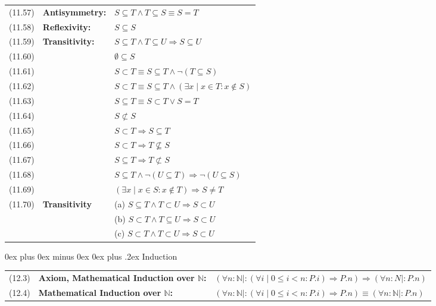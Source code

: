 \documentclass[letterpaper, 8pt]{extarticle}
\makeatletter
\renewcommand{\subsection}{\@startsection{subsection}{2}{0mm}%
                                {0ex plus 0ex minus 0ex}%
                                {0ex plus .2ex}%
                                {\normalfont\small\bfseries}}
\newcommand{\To}{\Rightarrow}
\makeatother
\begin{document}
\begin{multicols*}{3}
\begin{tabulary}{\linewidth}{@{}lLL@{}}
        (11.57) & \textbf{Antisymmetry:} & $S \subseteq T \land T \subseteq S \equiv S = T$ \\
        (11.58) & \textbf{Reflexivity:} & $S \subseteq S$ \\
        (11.59) & \textbf{Transitivity:} & $S \subseteq T \land T \subseteq U \To S \subseteq U$ \\
        (11.60) & & $\emptyset \subseteq S$ \\
        (11.61) & & $S \subset T \equiv S \subseteq T \land \neg (T \subseteq S)$ \\
        (11.62) & & $S \subset T \equiv S \subseteq T \land (\exists x \mid x \in T : x \notin S)$ \\
        (11.63) & & $S \subseteq T \equiv S \subset T \lor S = T$ \\
        (11.64) & & $S \not\subset S$ \\
        (11.65) & & $S \subset T \To S \subseteq T$ \\
        (11.66) & & $S \subset T \To T \not\subseteq S$ \\
        (11.67) & & $S \subseteq T \To T \not\subset S$ \\
        (11.68) & & $S \subseteq T \land \neg (U \subseteq T) \To \neg(U \subseteq S)$ \\
        (11.69) & & $(\exists x \mid x \in S : x \notin T) \To S \neq T$ \\
        (11.70) & \textbf{Transitivity} & (a) $S \subseteq T \land T \subset U \To S \subset U$ \\
        & & (b) $S \subset T \land T \subseteq U \To S \subset U$ \\
        & & (c) $S \subset T \land T \subset U \To S \subset U$ \\
    \end{tabulary}

    \subsection{Induction}
    \begin{tabulary}{\linewidth}{@{}lLL@{}}
        (12.3) & \textbf{Axiom, Mathematical Induction over $\mathbb{N}$:} & $(\forall n : \mathbb{N} \mid : (\forall i \mid 0 \leq i < n : P.i) \To P.n) \To (\forall n : N \mid : P.n)$ \\
        (12.4) & \textbf{Mathematical Induction over $\mathbb{N}$:} & $(\forall n : \mathbb{N} \mid : (\forall i \mid 0 \leq i < n : P.i) \To P.n) \equiv (\forall n : \mathbb{N} \mid : P.n)$ \\
    \end{tabulary}

\end{multicols*}
\end{document}
